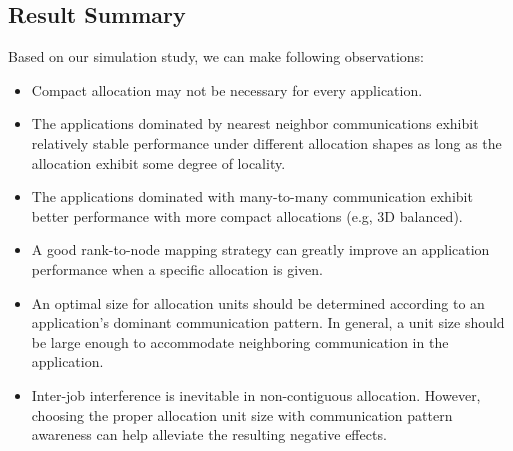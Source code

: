 \subsection{Result Summary}
\label{sec:summary}

Based on our simulation study, we can make following observations:

\begin{itemize}

    \item Compact allocation may not be necessary for every application. 
    
    \item The applications dominated by nearest neighbor communications exhibit 
    relatively stable performance under different allocation shapes as long as
    the allocation exhibit some degree of locality.
    
     
    \item The applications dominated with many-to-many communication exhibit 
    better performance with more compact allocations (e.g, 3D balanced).
    
    \item A good rank-to-node mapping strategy can greatly improve 
    an application performance when a specific allocation is given.
    
    \item An optimal size for allocation units should be determined 
    according to an application's dominant communication pattern. 
    In general, a unit size should be large enough to accommodate  
    neighboring communication in the application. 
    
    \item Inter-job interference is inevitable in non-contiguous allocation. 
    However, choosing the proper allocation unit size with communication 
    pattern awareness can help alleviate the resulting negative effects. 
    
\end{itemize}





